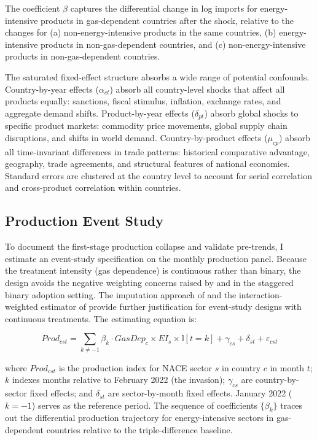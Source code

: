 \documentclass[12pt]{article}
\newcommand{\ind}{\mathbb{I}}
\begin{document}
The coefficient $\beta$ captures the differential change in log imports for energy-intensive products in gas-dependent countries after the shock, relative to the changes for (a) non-energy-intensive products in the same countries, (b) energy-intensive products in non-gas-dependent countries, and (c) non-energy-intensive products in non-gas-dependent countries.

The saturated fixed-effect structure absorbs a wide range of potential confounds. Country-by-year effects ($\alpha_{ct}$) absorb all country-level shocks that affect all products equally: sanctions, fiscal stimulus, inflation, exchange rates, and aggregate demand shifts. Product-by-year effects ($\delta_{pt}$) absorb global shocks to specific product markets: commodity price movements, global supply chain disruptions, and shifts in world demand. Country-by-product effects ($\mu_{cp}$) absorb all time-invariant differences in trade patterns: historical comparative advantage, geography, trade agreements, and structural features of national economies. Standard errors are clustered at the country level to account for serial correlation and cross-product correlation within countries.

\subsection{Production Event Study}

To document the first-stage production collapse and validate pre-trends, I estimate an event-study specification on the monthly production panel. Because the treatment intensity (gas dependence) is continuous rather than binary, the design avoids the negative weighting concerns raised by \citet{deChaisemartin2020} and \citet{callawaysantanna2021} in the staggered binary adoption setting. The imputation approach of \citet{borusyak2024} and the interaction-weighted estimator of \citet{sunAbraham2021} provide further justification for event-study designs with continuous treatments. The estimating equation is:

\begin{equation}
Prod_{cst} = \sum_{k \neq -1} \beta_k \cdot GasDep_c \times EI_s \times \ind[t = k] + \gamma_{cs} + \delta_{st} + \varepsilon_{cst}
\label{eq:event_study}
\end{equation}

\noindent where $Prod_{cst}$ is the production index for NACE sector $s$ in country $c$ in month $t$; $k$ indexes months relative to February 2022 (the invasion); $\gamma_{cs}$ are country-by-sector fixed effects; and $\delta_{st}$ are sector-by-month fixed effects. January 2022 ($k = -1$) serves as the reference period. The sequence of coefficients $\{\beta_k\}$ traces out the differential production trajectory for energy-intensive sectors in gas-dependent countries relative to the triple-difference baseline.
\end{document}
